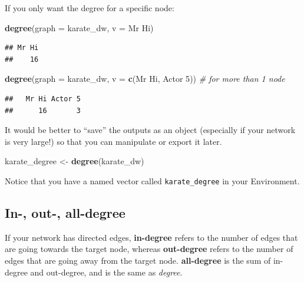 \documentclass[
]{book}
\newenvironment{Shaded}{\begin{snugshade}}{\end{snugshade}}
\newcommand{\AttributeTok}[1]{\textcolor[rgb]{0.13,0.29,0.53}{#1}}
\newcommand{\CommentTok}[1]{\textcolor[rgb]{0.56,0.35,0.01}{\textit{#1}}}
\newcommand{\FunctionTok}[1]{\textcolor[rgb]{0.13,0.29,0.53}{\textbf{#1}}}
\newcommand{\NormalTok}[1]{#1}
\newcommand{\OtherTok}[1]{\textcolor[rgb]{0.56,0.35,0.01}{#1}}
\newcommand{\StringTok}[1]{\textcolor[rgb]{0.31,0.60,0.02}{#1}}
\begin{document}
If you only want the degree for a specific node:

\begin{Shaded}
\begin{Highlighting}[]
\FunctionTok{degree}\NormalTok{(}\AttributeTok{graph =}\NormalTok{ karate\_dw, }\AttributeTok{v =} \StringTok{\textquotesingle{}Mr Hi\textquotesingle{}}\NormalTok{)}
\end{Highlighting}
\end{Shaded}

\begin{verbatim}
## Mr Hi 
##    16
\end{verbatim}

\begin{Shaded}
\begin{Highlighting}[]
\FunctionTok{degree}\NormalTok{(}\AttributeTok{graph =}\NormalTok{ karate\_dw, }\AttributeTok{v =} \FunctionTok{c}\NormalTok{(}\StringTok{\textquotesingle{}Mr Hi\textquotesingle{}}\NormalTok{, }\StringTok{\textquotesingle{}Actor 5\textquotesingle{}}\NormalTok{)) }\CommentTok{\# for more than 1 node}
\end{Highlighting}
\end{Shaded}

\begin{verbatim}
##   Mr Hi Actor 5 
##      16       3
\end{verbatim}

It would be better to ``save'' the outputs as an object (especially if your network is very large!) so that you can manipulate or export it later.

\begin{Shaded}
\begin{Highlighting}[]
\NormalTok{karate\_degree }\OtherTok{\textless{}{-}} \FunctionTok{degree}\NormalTok{(karate\_dw)}
\end{Highlighting}
\end{Shaded}

Notice that you have a named vector called \texttt{karate\_degree} in your Environment.

\subsection{In-, out-, all-degree}\label{in--out--all-degree}

If your network has directed edges, \textbf{in-degree} refers to the number of edges that are going towards the target node, whereas \textbf{out-degree} refers to the number of edges that are going away from the target node. \textbf{all-degree} is the sum of in-degree and out-degree, and is the same as \emph{degree}.
\end{document}
